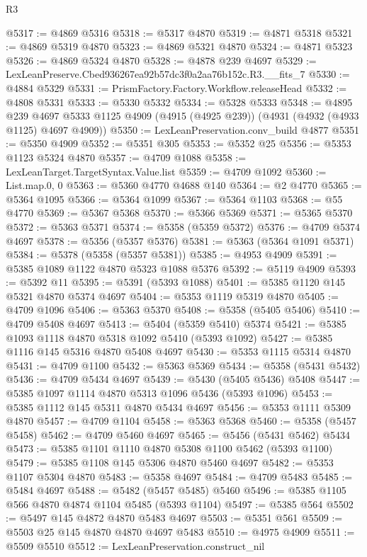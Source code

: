 \begin{lexlean}{R3}
\begin{coremodule}
@5317 := @4869 @5316
@5318 := @5317 @4870
@5319 := @4871 @5318
@5321 := @4869 @5319 @4870
@5323 := @4869 @5321 @4870
@5324 := @4871 @5323
@5326 := @4869 @5324 @4870
@5328 := @4878 @239 @4697
@5329 := LexLeanPreserve.Cbed936267ea92b57dc3f0a2aa76b152c.R3.__fits_7
@5330 := @4884 @5329
@5331 := PrismFactory.Factory.Workflow.releaseHead
@5332 := @4808 @5331
@5333 := @5330 @5332
@5334 := @5328 @5333
@5348 := @4895
    @239
    @4697
    @5333
    @1125
    @4909
    (@4915 (@4925 @239))
    (@4931 (@4932 (@4933 @1125) @4697 @4909))
@5350 := LexLeanPreservation.conv_build @4877
@5351 := @5350 @4909
@5352 := @5351 @305
@5353 := @5352 @25
@5356 := @5353 @1123 @5324 @4870
@5357 := @4709 @1088
@5358 := LexLeanTarget.TargetSyntax.Value.list
@5359 := @4709 @1092
@5360 := List.map.{0, 0}
@5363 := @5360 @4770 @4688 @140
@5364 := @2 @4770
@5365 := @5364 @1095
@5366 := @5364 @1099
@5367 := @5364 @1103
@5368 := @55 @4770
@5369 := @5367 @5368
@5370 := @5366 @5369
@5371 := @5365 @5370
@5372 := @5363 @5371
@5374 := @5358 (@5359 @5372)
@5376 := @4709 @5374 @4697
@5378 := @5356 (@5357 @5376)
@5381 := @5363 (@5364 @1091 @5371)
@5384 := @5378 (@5358 (@5357 @5381))
@5385 := @4953 @4909
@5391 := @5385 @1089 @1122 @4870 @5323 @1088 @5376
@5392 := @5119 @4909
@5393 := @5392 @11
@5395 := @5391 (@5393 @1088)
@5401 := @5385 @1120 @145 @5321 @4870 @5374 @4697
@5404 := @5353 @1119 @5319 @4870
@5405 := @4709 @1096
@5406 := @5363 @5370
@5408 := @5358 (@5405 @5406)
@5410 := @4709 @5408 @4697
@5413 := @5404 (@5359 @5410) @5374
@5421 := @5385 @1093 @1118 @4870 @5318 @1092 @5410 (@5393 @1092)
@5427 := @5385 @1116 @145 @5316 @4870 @5408 @4697
@5430 := @5353 @1115 @5314 @4870
@5431 := @4709 @1100
@5432 := @5363 @5369
@5434 := @5358 (@5431 @5432)
@5436 := @4709 @5434 @4697
@5439 := @5430 (@5405 @5436) @5408
@5447 := @5385 @1097 @1114 @4870 @5313 @1096 @5436 (@5393 @1096)
@5453 := @5385 @1112 @145 @5311 @4870 @5434 @4697
@5456 := @5353 @1111 @5309 @4870
@5457 := @4709 @1104
@5458 := @5363 @5368
@5460 := @5358 (@5457 @5458)
@5462 := @4709 @5460 @4697
@5465 := @5456 (@5431 @5462) @5434
@5473 := @5385 @1101 @1110 @4870 @5308 @1100 @5462 (@5393 @1100)
@5479 := @5385 @1108 @145 @5306 @4870 @5460 @4697
@5482 := @5353 @1107 @5304 @4870
@5483 := @5358 @4697
@5484 := @4709 @5483
@5485 := @5484 @4697
@5488 := @5482 (@5457 @5485) @5460
@5496 := @5385 @1105 @566 @4870 @4874 @1104 @5485 (@5393 @1104)
@5497 := @5385 @564
@5502 := @5497 @145 @4872 @4870 @5483 @4697
@5503 := @5351 @561
@5509 := @5503 @25 @145 @4870 @4870 @4697 @5483
@5510 := @4975 @4909
@5511 := @5509 @5510
@5512 := LexLeanPreservation.construct_nil

\end{coremodule}
\end{lexlean}
